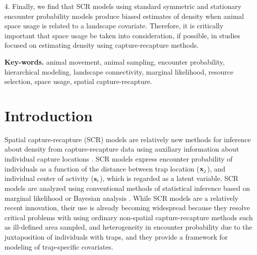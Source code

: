 \documentclass[12pt]{article}
\begin{document}
4. Finally, we find that SCR
models using standard symmetric and stationary encounter probability
models produce biased estimates of density when animal space
usage is related to a landscape covariate. Therefore, it is
critically important that space usage be taken into consideration, if
possible, in studies focused on estimating density using
capture-recapture methods.

\vspace{.2in}

{\bf Key-words. }
animal movement, animal sampling, encounter
probability, hierarchical modeling, landscape connectivity, marginal likelihood,
resource selection, space usage,  spatial capture-recapture. \\


\section{Introduction}

Spatial capture-recapture (SCR) models are relatively new methods for
inference about density from capture-recapture data using auxiliary
information about individual capture locations
\citep{efford:2004,borchers_efford:2008, royle_young:2008}.  SCR
models express encounter probability of individuals as a function of
the distance between trap location (${\bf x}_{j}$), and individual
center of activity (${\bf s}_{i}$), which is regarded as a latent
variable.  SCR models are analyzed using conventional methods of
statistical inference based on marginal likelihood
\citep{borchers_efford:2008} or Bayesian analysis
\citep{royle_young:2008}.  While SCR models are a relatively recent
innovation, their use is already becoming widespread
\citep{efford_etal:2009ecol, gardner_etal:2010jwm,
  gardner_etal:2010ecol,kery_etal:2010, gopalaswamy_etal:2012,
  foster_harmsen:2012} because they resolve critical problems with
using ordinary non-spatial capture-recapture methods such as
ill-defined area sampled, and heterogeneity in encounter probability
due to the juxtaposition of individuals with traps, and they provide a
framework for modeling of trap-specific covariates.  
\end{document}
